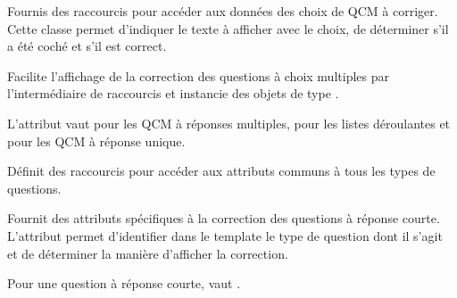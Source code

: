 \documentclass[a4,10pt,french]{sphinxmanual}
\begin{document}
\begin{fulllineitems}
\label{source:quiz.utils.correct.CorrectChoice}
Fournis des raccourcis pour accéder aux données des choix de QCM à corriger.
Cette classe permet d'indiquer le texte à afficher avec le choix, de déterminer
s'il a été coché et s'il est correct.

\end{fulllineitems}


\begin{fulllineitems}
\label{source:quiz.utils.correct.CorrectQcm}
Facilite l'affichage de la correction des questions à choix multiples par
l'intermédiaire de raccourcis et instancie des objets de type {\hyperref[source:quiz.utils.correct.CorrectChoice]{\emph{}}}.

L'attribut  vaut  pour les QCM à réponses multiples,  pour
les listes déroulantes et  pour les QCM à réponse unique.

\end{fulllineitems}


\begin{fulllineitems}
\label{source:quiz.utils.correct.CorrectQuestion}
Définit des raccourcis pour accéder aux attributs communs à tous les types
de questions.

\end{fulllineitems}


\begin{fulllineitems}
\label{source:quiz.utils.correct.CorrectSq}
Fournit des attributs spécifiques à la correction des questions à réponse courte.
L'attribut  permet d'identifier dans le template le type de question
dont il s'agit et de déterminer la manière d'afficher la correction.

Pour une question à réponse courte,  vaut .

\end{fulllineitems}
\end{document}
